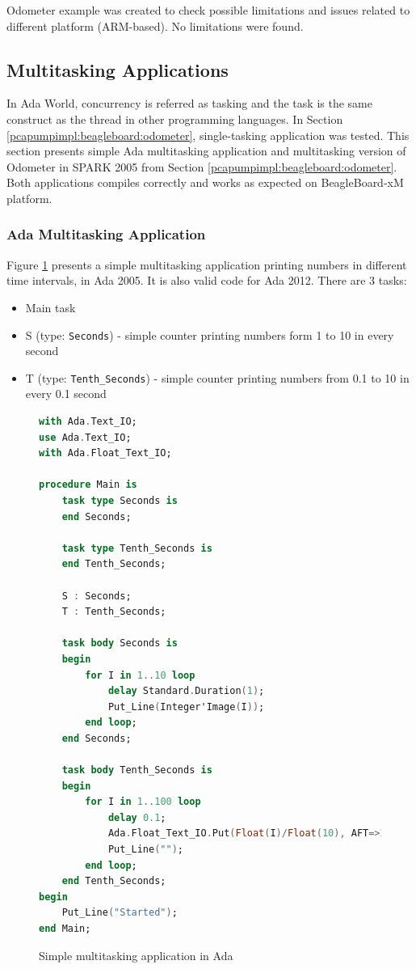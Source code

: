 Odometer example was created to check possible limitations and issues related to different platform (ARM-based). No limitations were found.


\subsection{Multitasking Applications}
\label{pcapumpimpl:beagleboard:multitasking}

In Ada World, concurrency is referred as tasking and the task is the same construct as the thread in other programming languages. In Section \ref{pcapumpimpl:beagleboard:odometer}, single-tasking application was tested. This section presents simple Ada multitasking application and multitasking version of Odometer in SPARK 2005 from Section \ref{pcapumpimpl:beagleboard:odometer}. Both applications compiles correctly and works as expected on BeagleBoard-xM platform.

\subsubsection{Ada Multitasking Application}

Figure \ref{listing:HelloTasking} presents a simple multitasking application printing numbers in different time intervals, in Ada 2005. It is also valid code for Ada 2012. There are 3 tasks:
\begin{itemize}
    \item Main task
    \item S (type: \lstinline{Seconds}) - simple counter printing numbers form 1 to 10 in every second
    \item T (type: \lstinline{Tenth_Seconds}) - simple counter printing numbers from 0.1 to 10 in every 0.1 second
\end{itemize}

\begin{figure}[ht]
\singlespacing
\begin{lstlisting}[language=ada, frame=single, gobble=0]
with Ada.Text_IO;
use Ada.Text_IO;
with Ada.Float_Text_IO;

procedure Main is
    task type Seconds is
    end Seconds;

    task type Tenth_Seconds is
    end Tenth_Seconds;

    S : Seconds;
    T : Tenth_Seconds;

    task body Seconds is
    begin
        for I in 1..10 loop
            delay Standard.Duration(1);
            Put_Line(Integer'Image(I));
        end loop;
    end Seconds;

    task body Tenth_Seconds is
    begin
        for I in 1..100 loop            
            delay 0.1;            
            Ada.Float_Text_IO.Put(Float(I)/Float(10), AFT=>2, EXP=>0);
            Put_Line("");
        end loop;
    end Tenth_Seconds;
begin
    Put_Line("Started");
end Main;
\end{lstlisting} 
\doublespacing
\caption{Simple multitasking application in Ada}
\label{listing:HelloTasking}
\end{figure}

